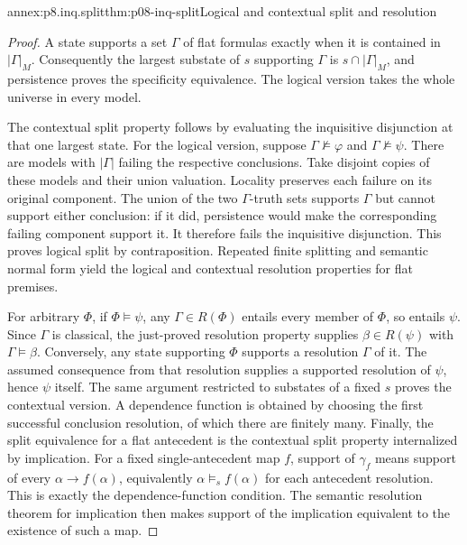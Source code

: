 \begin{annexitem}{annex:p8.inq.split}{thm:p08-inq-split}{Logical and contextual split and resolution}
\begin{proof}
A state supports a set \(\Gamma\) of flat formulas exactly when it is
contained in \(|\Gamma|_M\). Consequently the largest substate of \(s\)
supporting \(\Gamma\) is \(s\cap|\Gamma|_M\), and persistence proves
the specificity equivalence. The logical version takes the whole universe
in every model.

The contextual split property follows by evaluating the inquisitive
disjunction at that one largest state. For the logical version, suppose
\(\Gamma\not\models\varphi\) and \(\Gamma\not\models\psi\).
There are models with \(|\Gamma|\) failing the respective conclusions.
Take disjoint copies of these models and their union valuation. Locality
preserves each failure on its original component. The union of the two
\(\Gamma\)-truth sets supports \(\Gamma\) but cannot support either
conclusion: if it did, persistence would make the corresponding failing
component support it. It therefore fails the inquisitive disjunction.
This proves logical split by contraposition. Repeated finite splitting
and semantic normal form yield the logical and contextual resolution
properties for flat premises.

For arbitrary \(\Phi\), if \(\Phi\models\psi\), any
\(\Gamma\in R(\Phi)\) entails every member of \(\Phi\), so entails
\(\psi\). Since \(\Gamma\) is classical, the just-proved resolution
property supplies \(\beta\in R(\psi)\) with \(\Gamma\models\beta\).
Conversely, any state supporting \(\Phi\) supports a resolution
\(\Gamma\) of it. The assumed consequence from that resolution supplies
a supported resolution of \(\psi\), hence \(\psi\) itself. The same
argument restricted to substates of a fixed \(s\) proves the contextual
version. A dependence function is obtained by choosing the first successful
conclusion resolution, of which there are finitely many. Finally,
the split equivalence for a flat antecedent is the contextual split
property internalized by implication.
For a fixed single-antecedent map \(f\), support of \(\gamma_f\)
means support of every \(\alpha\to f(\alpha)\), equivalently
\(\alpha\models_s f(\alpha)\) for each antecedent resolution.
This is exactly the dependence-function condition. The semantic
resolution theorem for implication then makes support of the implication
equivalent to the existence of such a map.
\end{proof}
\end{annexitem}

